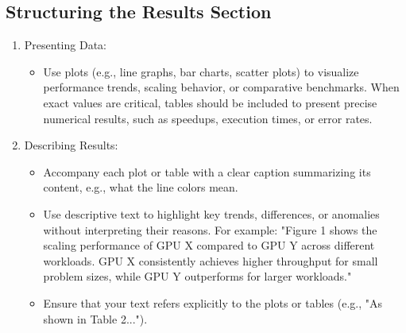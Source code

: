 \documentclass[conference]{IEEEtran}
\begin{document}
\subsection{Structuring the Results Section}
\begin{enumerate}
\item Presenting Data:  
\begin{itemize}
   \item Use plots (e.g., line graphs, bar charts, scatter plots) to visualize performance trends, scaling behavior, or comparative benchmarks.  
   When exact values are critical, tables should be included to present precise numerical results, such as speedups, execution times, or error rates.  
\end{itemize}

\item Describing Results:  
\begin{itemize}
   \item Accompany each plot or table with a clear caption summarizing its content, e.g., what the line colors mean.
   \item Use descriptive text to highlight key trends, differences, or anomalies without interpreting their reasons. For example: "Figure 1 shows the scaling performance of GPU X compared to GPU Y across different workloads. GPU X consistently achieves higher throughput for small problem sizes, while GPU Y outperforms for larger workloads."  
   \item Ensure that your text refers explicitly to the plots or tables (e.g., "As shown in Table 2...").  
\end{itemize}
\end{enumerate}
\end{document}

